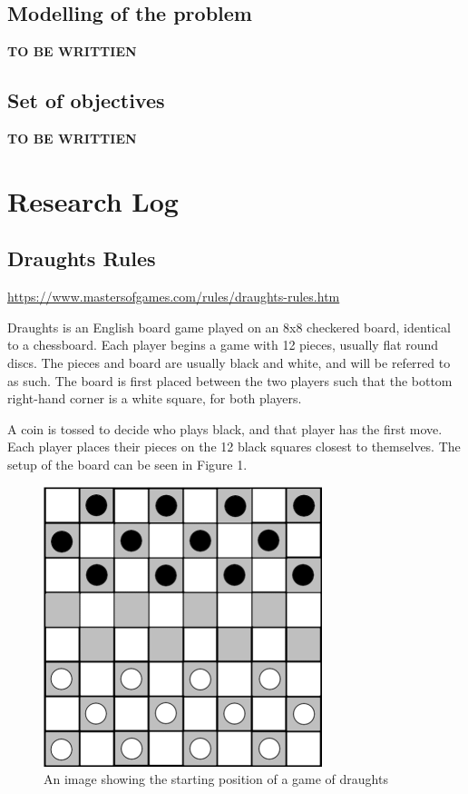 \documentclass{article}
\begin{document}
    \subsection{Modelling of the problem}
    \textbf{TO BE WRITTIEN}
    
    \subsection{Set of objectives}
    \textbf{TO BE WRITTIEN}
    
    \section{Research Log}

    \subsection{Draughts Rules}
    \url{https://www.mastersofgames.com/rules/draughts-rules.htm}

    Draughts is an English board game played on an 8x8 checkered board, identical to a chessboard.
    Each player begins a game with 12 pieces, usually flat round discs.
    The pieces and board are usually black and white, and will be referred to as such.
    The board is first placed between the two players such that the bottom right-hand corner is a white square,
    for both players.
    
    A coin is tossed to decide who plays black, and that player has the first move. Each player places their pieces
    on the 12 black squares closest to themselves. The setup of the board can be seen in Figure 1. 

    \begin{figure}
        \centering
        \includegraphics[scale=0.35]{The-starting-position-for-checkers.png}
        \caption{An image showing the starting position of a game of draughts}
    \end{figure}
\end{document}
